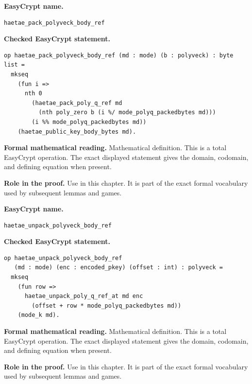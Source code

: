 \begin{formaldefinition}
\noindent\textbf{EasyCrypt name.}
\begin{lstlisting}[language=EasyCrypt,basicstyle=\ttfamily\scriptsize]
haetae_pack_polyveck_body_ref
\end{lstlisting}
\noindent\textbf{Checked EasyCrypt statement.}
\begin{lstlisting}[language=EasyCrypt,basicstyle=\ttfamily\scriptsize]
op haetae_pack_polyveck_body_ref (md : mode) (b : polyveck) : byte list =
  mkseq
    (fun i =>
      nth 0
        (haetae_pack_poly_q_ref md
          (nth poly_zero b (i %/ mode_polyq_packedbytes md)))
        (i %% mode_polyq_packedbytes md))
    (haetae_public_key_body_bytes md).
\end{lstlisting}
\noindent\textbf{Formal mathematical reading.}
Mathematical definition. This is a total EasyCrypt operation.  The exact displayed statement gives the domain, codomain, and defining equation when present.

\noindent\textbf{Role in the proof.}
Use in this chapter. It is part of the exact formal vocabulary used by subsequent lemmas and games.

\end{formaldefinition}

\begin{formaldefinition}
\noindent\textbf{EasyCrypt name.}
\begin{lstlisting}[language=EasyCrypt,basicstyle=\ttfamily\scriptsize]
haetae_unpack_polyveck_body_ref
\end{lstlisting}
\noindent\textbf{Checked EasyCrypt statement.}
\begin{lstlisting}[language=EasyCrypt,basicstyle=\ttfamily\scriptsize]
op haetae_unpack_polyveck_body_ref
   (md : mode) (enc : encoded_pkey) (offset : int) : polyveck =
  mkseq
    (fun row =>
      haetae_unpack_poly_q_ref_at md enc
        (offset + row * mode_polyq_packedbytes md))
    (mode_k md).
\end{lstlisting}
\noindent\textbf{Formal mathematical reading.}
Mathematical definition. This is a total EasyCrypt operation.  The exact displayed statement gives the domain, codomain, and defining equation when present.

\noindent\textbf{Role in the proof.}
Use in this chapter. It is part of the exact formal vocabulary used by subsequent lemmas and games.

\end{formaldefinition}

